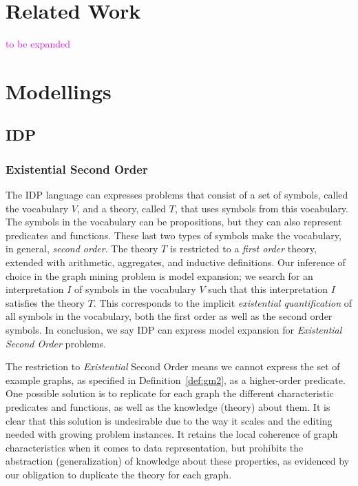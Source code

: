 \documentclass{article}
\theoremstyle{definition}
\newcommand{\sergey}[1]{\textcolor{magenta}{\marginpar{\sc Sergey} #1}}
\begin{document}
\section{Related Work}
\sergey{to be expanded}
\section{Modellings}
\subsection{IDP}
\subsubsection{Existential Second Order}
The IDP language can expresses problems that consist of a set of symbols, called the vocabulary $V$, and a theory, called $T$, that uses symbols from this vocabulary.
The symbols in the vocabulary can be propositions, but they can also represent predicates and functions.
These last two types of symbols make the vocabulary, in general, \emph{second order}.
The theory $T$ is restricted to a \emph{first order} theory, extended with arithmetic, aggregates, and inductive definitions.
Our inference of choice in the graph mining problem is model expansion; we search for an interpretation $I$ of symbols in the vocabulary $V$ such that this interpretation $I$ satisfies the theory $T$.
This corresponds to the implicit \emph{existential quantification} of all symbols in the vocabulary, both the first order as well as the second order symbols.
In conclusion, we say IDP can express model expansion for \emph{Existential Second Order} problems. 


The restriction to \emph{Existential} Second Order means we cannot express the set of example graphs, as specified in Definition~\ref{def:gm2}, as a higher-order predicate.
One possible solution is to replicate for each graph the different characteristic predicates and functions, as well as the knowledge (theory) about them.
It is clear that this solution is undesirable due to the way it scales and the editing needed with growing problem instances.
It retains the local coherence of graph characteristics when it comes to data representation, but prohibits the abstraction (generalization) of knowledge about these properties, as evidenced by our obligation to duplicate the theory for each graph.
\end{document}
